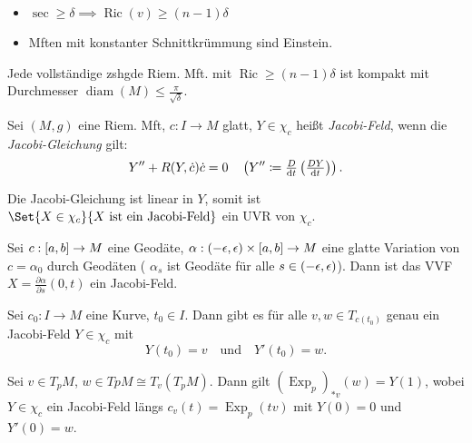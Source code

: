 \documentclass{cheat-sheet}
\DeclareMathOperator{\Exp}{Exp} %
\newcommand{\vinterval}{\ointerval{-\epsilon}{\epsilon}} %
\DeclareMathOperator{\diam}{diam} %
\DeclareMathOperator{\Ric}{Ric} %
\newcommand{\abinterval}{\cinterval{a}{b}} %
\begin{document}
\begin{beob}
  \begin{itemize}
    \item $\sec \geq \delta \implies \Ric(v) \geq (n{-}1) \delta$
    \item Mften mit konstanter Schnittkrümmung sind Einstein.
  \end{itemize}
\end{beob}

\begin{satz}
  Jede vollständige zshgde Riem. Mft. mit $\Ric \geq (n{-}1)\delta$ ist kompakt mit Durchmesser $\diam(M) \leq \tfrac{\pi}{\sqrt{\delta}}$.
\end{satz}


\begin{defn}
  Sei $(M, g)$ eine Riem. Mft, $c : I \to M$ glatt, $Y \in \chi_c$ heißt \emph{Jacobi-Feld}, wenn die \emph{Jacobi-Gleichung} gilt:
  \[
    Y'' + R(Y, \dot{c}) \dot{c} = 0 \quad
    \left( Y'' \coloneqq \tfrac{D}{\mathrm{d} t} \left( \tfrac{D Y}{\mathrm{d} t} \right) \right).
  \]
\end{defn}

\begin{bem}
  Die Jacobi-Gleichung ist linear in $Y$, somit ist $\Set{ X \in \chi_c }{ X \text{ ist ein Jacobi-Feld} }$ ein UVR von $\chi_c$.
\end{bem}

\begin{satz}
  Sei $c : \abinterval \to M$ eine Geodäte, $\alpha : \vinterval \times \abinterval \to M$ eine glatte Variation von $c = \alpha_0$ durch Geodäten (\dh{} $\alpha_s$ ist Geodäte für alle $s \in \vinterval$). Dann ist das VVF $X = \tfrac{\partial \alpha}{\partial s}(0,t)$ ein Jacobi-Feld.
\end{satz}

\begin{satz}
  Sei $c_0 : I \to M$ eine Kurve, $t_0 \in I$. Dann gibt es für alle $v, w \in T_{c(t_0)}$ genau ein Jacobi-Feld $Y \in \chi_c$ mit
  \[
    Y(t_0) = v
    \quad \text{und} \quad
    Y'(t_0) = w.
  \]
\end{satz}

\begin{satz}
  Sei $v \in T_p M$, $w \in Tp M \cong T_v \left( T_p M \right)$. Dann gilt $(\Exp_p)_{*v}(w) = Y(1)$, wobei $Y \in \chi_c$ ein Jacobi-Feld längs $c_v(t) = \Exp_p(tv)$ mit $Y(0) = 0$ und $Y'(0) = w$.
\end{satz}
\end{document}
